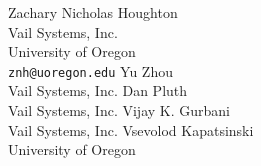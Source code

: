 %
%
Zachary Nicholas Houghton \\
Vail Systems, Inc. \\ University of Oregon \\
\texttt{znh@uoregon.edu}
\And Yu Zhou \\
Vail Systems, Inc.
\And Dan Pluth \\
Vail Systems, Inc.
\AND Vijay K. Gurbani \\
Vail Systems, Inc.
\And Vsevolod Kapatsinski \\
University of Oregon
